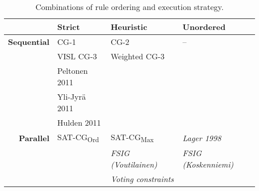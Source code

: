 




\def\satcgMax{SAT-CG\textsubscript{Max}}
\def\satcgOrd{SAT-CG\textsubscript{Ord}}
\def\noncg#1{{\em \color{gray} #1}}

\begin{table}[h!]
\centering

  \begin{tabular}{r | p{2.5cm} | p{3.5 cm} | p{3.5cm}}
           & \textbf{Strict} & \textbf{Heuristic} & \textbf{Unordered} \\ \hline
\textbf{Sequential}
           & CG-1 \cite{karlsson1990cgp}   
                             & CG-2 \cite{tapanainen1996} %
                                                  & --           \\ 
           & VISL CG-3  \cite{vislcg3}      
                             & Weighted CG-3 \cite{pirinen2015} & \\ 
           & Peltonen 2011 \cite{peltonen2011}  &  &\\ %
           & Yli-Jyrä 2011 \cite{yli-jyra2011cg_engine}  & & \\ 
           & Hulden 2011 \cite{hulden2011cg_engine} & & \\ \hline
\textbf{Parallel}
           & \satcgOrd       & \satcgMax          & \noncg{Lager 1998 \cite{lager98}} \\ 
           &                 & \noncg{FSIG (Voutilainen) \cite{voutilainen1994designing}} 
                                                  & \noncg{FSIG (Koskenniemi) \cite{koskenniemi90}} \\
           &                 & \noncg{Voting constraints \cite{oflazer97votingconstraints}}  \\


  \end{tabular}
  \caption{Combinations of rule ordering and execution strategy.}
  \label{table:nelikentta}
\end{table}

